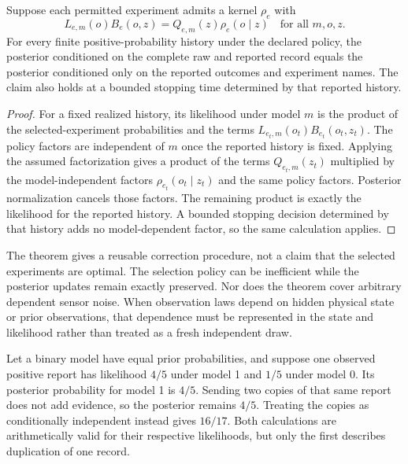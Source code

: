 \begin{MUtheorem}\label{MU:thm:adaptive-bayes}
Suppose each permitted experiment admits a kernel $\rho_e$ with
\[
L_{e,m}(o)B_e(o,z)=Q_{e,m}(z)\rho_e(o\mid z)
\quad\text{for all }m,o,z.
\]
For every finite positive-probability history under the declared policy, the posterior conditioned on the complete raw and reported record equals the posterior conditioned only on the reported outcomes and experiment names. The claim also holds at a bounded stopping time determined by that reported history.
\end{MUtheorem}
\begin{proof}
For a fixed realized history, its likelihood under model $m$ is the product of the selected-experiment probabilities and the terms $L_{e_t,m}(o_t)B_{e_t}(o_t,z_t)$. The policy factors are independent of $m$ once the reported history is fixed. Applying the assumed factorization gives a product of the terms $Q_{e_t,m}(z_t)$ multiplied by the model-independent factors $\rho_{e_t}(o_t\mid z_t)$ and the same policy factors. Posterior normalization cancels those factors. The remaining product is exactly the likelihood for the reported history. A bounded stopping decision determined by that history adds no model-dependent factor, so the same calculation applies.
\end{proof}

The theorem gives a reusable correction procedure, not a claim that the selected experiments are optimal. The selection policy can be inefficient while the posterior updates remain exactly preserved. Nor does the theorem cover arbitrary dependent sensor noise. When observation laws depend on hidden physical state or prior observations, that dependence must be represented in the state and likelihood rather than treated as a fresh independent draw.

\begin{MUcounterexample}\label{MU:ex:duplicate-record}
Let a binary model have equal prior probabilities, and suppose one observed positive report has likelihood $4/5$ under model 1 and $1/5$ under model 0. Its posterior probability for model 1 is $4/5$. Sending two copies of that same report does not add evidence, so the posterior remains $4/5$. Treating the copies as conditionally independent instead gives $16/17$. Both calculations are arithmetically valid for their respective likelihoods, but only the first describes duplication of one record.
\end{MUcounterexample}


